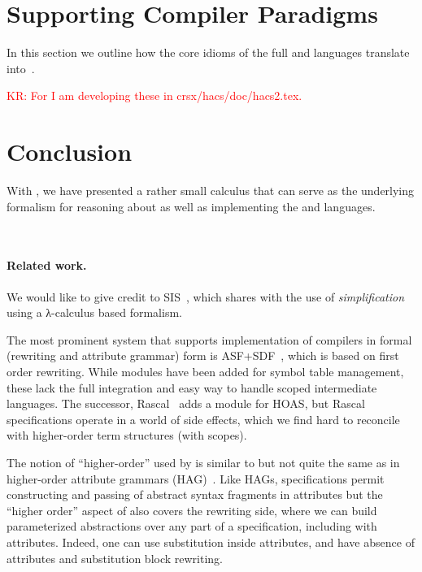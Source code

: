 \documentclass[letterpaper,11pt]{article}
\newcommand{\KR}[1]{\textcolor{red}{KR: #1}}
\begin{document}



\section{Supporting Compiler Paradigms}
\label{sec:compiling}

In this section we outline how the core idioms of the full \CRSX and \HAX languages translate
into~\hax.

\KR{For \HAX I am developing these in crsx/hacs/doc/hacs2.tex.}



\section{Conclusion}
\label{sec:conc}

With \hax, we have presented a rather small calculus that can serve as the underlying formalism for
reasoning about as well as implementing the \CRSX and \HAX languages.


~\cite{Knuth:mst1968} 
~\cite{Aho+:2006}


\paragraph*{Related work.}

We would like to give credit to SIS~\cite{Mosses:daimi1979}, which shares with \hax the use of
\emph{simplification} using a λ-calculus based formalism.

The most prominent system that supports implementation of compilers in formal (rewriting and
attribute grammar) form is ASF+SDF~\cite{Brand+:toplas2002}, which is based on first order
rewriting. While modules have been added for symbol table management, these lack the full
integration and easy way to handle scoped intermediate languages. The successor,
Rascal~\cite{Bos+:eptcs2011} adds a module for HOAS, but Rascal specifications operate in a world of
side effects, which we find hard to reconcile with higher-order term structures (with scopes).

The notion of ``higher-order'' used by \hax is similar to but not quite the same as in higher-order
attribute grammars (HAG)~\cite{VogtSwierstraKuiper:pldi1989}. Like HAGs, \hax specifications permit
constructing and passing of abstract syntax fragments in attributes but the ``higher order'' aspect
of \hax also covers the rewriting side, where we can build parameterized abstractions over any part
of a specification, including with attributes. Indeed, one can use substitution inside attributes,
and have absence of attributes and substitution block rewriting.
\end{document}
